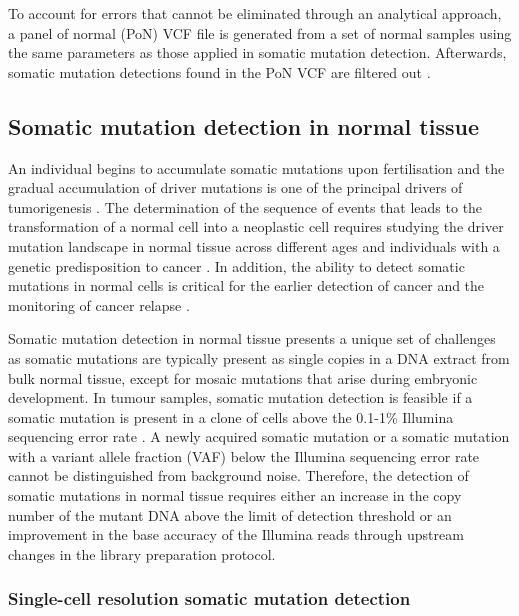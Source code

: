 To account for errors that cannot be eliminated through an analytical approach, a panel of normal (PoN) VCF file is generated from a set of normal samples using the same parameters as those applied in somatic mutation detection. Afterwards, somatic mutation detections found in the PoN VCF are filtered out \cite{Cibulskis2013-gw}.

\subsection{Somatic mutation detection in normal tissue}
\label{sec:somatic_mutation_detection_in_normal_tissue}

An individual begins to accumulate somatic mutations upon fertilisation and the gradual accumulation of driver mutations is one of the principal drivers of tumorigenesis \cite{Stratton2009-of}. The determination of the sequence of events that leads to the transformation of a normal cell into a neoplastic cell requires studying the driver mutation landscape in normal tissue across different ages and individuals with a genetic predisposition to cancer \cite{Martincorena2015-io}. In addition, the ability to detect somatic mutations in normal cells is critical for the earlier detection of cancer and the monitoring of cancer relapse \cite{Newman2014-qq, Newman2016-cy}.

Somatic mutation detection in normal tissue presents a unique set of challenges as somatic mutations are typically present as single copies in a DNA extract from bulk normal tissue, except for mosaic mutations that arise during embryonic development. In tumour samples, somatic mutation detection is feasible if a somatic mutation is present in a clone of cells above the 0.1-1\% Illumina sequencing error rate \cite{Cibulskis2013-gw}. A newly acquired somatic mutation or a somatic mutation with a variant allele fraction (VAF) below the Illumina sequencing error rate cannot be distinguished from background noise. Therefore, the detection of somatic mutations in normal tissue requires either an increase in the copy number of the mutant DNA above the limit of detection threshold or an improvement in the base accuracy of the Illumina reads through upstream changes in the library preparation protocol.

\subsubsection{Single-cell resolution somatic mutation detection}

